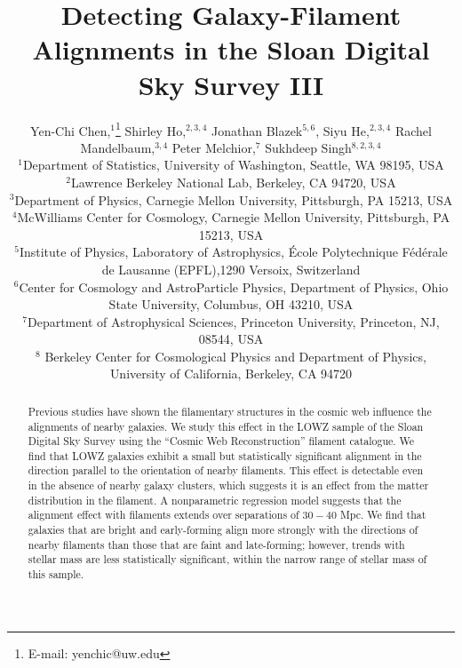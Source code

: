 \documentclass[usenatbib,useAMS]{mnras}
\title[Detecting Galaxy-Filament Alignments]{
Detecting Galaxy-Filament Alignments in the Sloan Digital Sky Survey III
}
\author[Yen-Chi Chen et al.]{Yen-Chi Chen,$^{1}$\thanks{E-mail:
yenchic@uw.edu}
Shirley Ho,$^{2,3,4}$
Jonathan Blazek$^{5,6}$,
Siyu He,$^{2,3,4}$
Rachel Mandelbaum,$^{3,4}$\newauthor
Peter Melchior,$^{7}$
Sukhdeep Singh$^{8,2,3,4}$
\\
$^{1}$Department of Statistics, University of Washington, Seattle, WA 98195, USA\\
$^{2}$Lawrence Berkeley National Lab, Berkeley, CA 94720, USA\\
$^{3}$Department of Physics, Carnegie Mellon University, Pittsburgh, PA 15213, USA\\
$^{4}$McWilliams Center for Cosmology, Carnegie Mellon University, Pittsburgh, PA 15213, USA\\
$^{5}$Institute of Physics, Laboratory of Astrophysics, \'{E}cole Polytechnique F\'{e}d\'{e}rale de Lausanne (EPFL),1290 Versoix, Switzerland\\
$^{6}$Center for Cosmology and AstroParticle Physics, Department of Physics, Ohio State University, Columbus, OH 43210, USA\\
$^{7}$Department of Astrophysical Sciences, Princeton University, Princeton, NJ, 08544, USA\\
$^8$ Berkeley Center for Cosmological Physics and Department of Physics, University of California, Berkeley, CA 94720
}
\theoremstyle{remark}
\begin{document}
\pagerange{\pageref{firstpage}--\pageref{lastpage}} 

\maketitle

\label{firstpage}

\begin{abstract}
Previous studies have shown the filamentary structures in the cosmic web influence the alignments of
nearby galaxies. 
We study this effect in the LOWZ sample of the Sloan Digital Sky Survey
using the ``Cosmic Web Reconstruction'' filament catalogue.
We find that LOWZ 
galaxies exhibit a small but statistically significant alignment in the direction parallel to the
orientation of nearby filaments.  This effect is detectable even in the absence of nearby galaxy
clusters, which suggests it is an effect from the matter distribution in the filament.
A nonparametric regression model suggests
that the alignment effect with filaments extends over separations of $30-40$ Mpc. 
We find that galaxies that are bright and early-forming align more strongly with the directions of
nearby filaments than those that are faint and late-forming; however, trends with stellar mass are
less statistically significant, within the narrow range of stellar mass of this sample.



\end{abstract}
\end{document}
